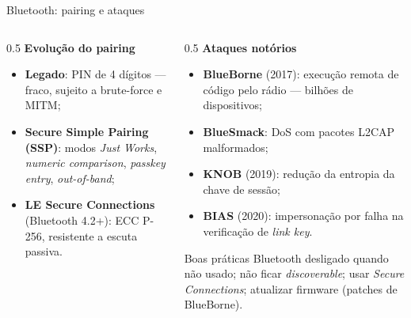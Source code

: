 \documentclass[aspectratio=169,11pt]{beamer}
\begin{document}
\begin{frame}{Bluetooth: pairing e ataques}
  \begin{columns}
    \begin{column}{0.5\textwidth}
      \textbf{Evolução do pairing}
      \begin{itemize}
        \item \textbf{Legado}: PIN de 4 dígitos --- fraco, sujeito a brute-force e MITM;
        \item \textbf{Secure Simple Pairing (SSP)}: modos \emph{Just Works}, \emph{numeric comparison}, \emph{passkey entry}, \emph{out-of-band};
        \item \textbf{LE Secure Connections} (Bluetooth 4.2+): ECC P-256, resistente a escuta passiva.
      \end{itemize}
    \end{column}
    \begin{column}{0.5\textwidth}
      \textbf{Ataques notórios}
      \begin{itemize}
        \item \textbf{BlueBorne} (2017): execução remota de código pelo rádio --- bilhões de dispositivos;
        \item \textbf{BlueSmack}: DoS com pacotes L2CAP malformados;
        \item \textbf{KNOB} (2019): redução da entropia da chave de sessão;
        \item \textbf{BIAS} (2020): impersonação por falha na verificação de \emph{link key}.
      \end{itemize}
      \begin{exampleblock}{Boas práticas}
        Bluetooth desligado quando não usado; não ficar \emph{discoverable}; usar \emph{Secure Connections}; atualizar firmware (patches de BlueBorne).
      \end{exampleblock}
    \end{column}
  \end{columns}
\end{frame}
\end{document}
